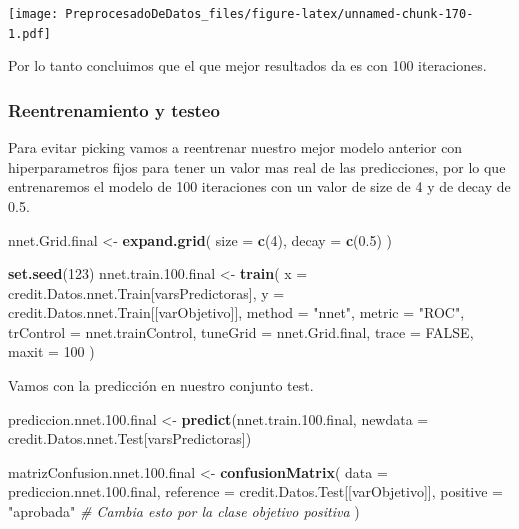 \documentclass[
]{article}
\newenvironment{Shaded}{\begin{snugshade}}{\end{snugshade}}
\newcommand{\AttributeTok}[1]{\textcolor[rgb]{0.13,0.29,0.53}{#1}}
\newcommand{\CommentTok}[1]{\textcolor[rgb]{0.56,0.35,0.01}{\textit{#1}}}
\newcommand{\ConstantTok}[1]{\textcolor[rgb]{0.56,0.35,0.01}{#1}}
\newcommand{\DecValTok}[1]{\textcolor[rgb]{0.00,0.00,0.81}{#1}}
\newcommand{\FloatTok}[1]{\textcolor[rgb]{0.00,0.00,0.81}{#1}}
\newcommand{\FunctionTok}[1]{\textcolor[rgb]{0.13,0.29,0.53}{\textbf{#1}}}
\newcommand{\NormalTok}[1]{#1}
\newcommand{\OtherTok}[1]{\textcolor[rgb]{0.56,0.35,0.01}{#1}}
\newcommand{\StringTok}[1]{\textcolor[rgb]{0.31,0.60,0.02}{#1}}
\begin{document}
\texttt{[image: PreprocesadoDeDatos\_files/figure-latex/unnamed-chunk-170-1.pdf]}

Por lo tanto concluimos que el que mejor resultados da es con 100
iteraciones.

\hypertarget{reentrenamiento-y-testeo-1}{%
\subsubsection{Reentrenamiento y
testeo}\label{reentrenamiento-y-testeo-1}}

Para evitar picking vamos a reentrenar nuestro mejor modelo anterior con
hiperparametros fijos para tener un valor mas real de las predicciones,
por lo que entrenaremos el modelo de 100 iteraciones con un valor de
size de 4 y de decay de 0.5.

\begin{Shaded}
\begin{Highlighting}[]
\NormalTok{nnet.Grid.final }\OtherTok{\textless{}{-}} \FunctionTok{expand.grid}\NormalTok{(}
  \AttributeTok{size =} \FunctionTok{c}\NormalTok{(}\DecValTok{4}\NormalTok{),}
  \AttributeTok{decay =} \FunctionTok{c}\NormalTok{(}\FloatTok{0.5}\NormalTok{)}
\NormalTok{)}

\FunctionTok{set.seed}\NormalTok{(}\DecValTok{123}\NormalTok{)}
\NormalTok{nnet.train.}\FloatTok{100.}\NormalTok{final }\OtherTok{\textless{}{-}} \FunctionTok{train}\NormalTok{(}
  \AttributeTok{x =}\NormalTok{ credit.Datos.nnet.Train[varsPredictoras],}
  \AttributeTok{y =}\NormalTok{ credit.Datos.nnet.Train[[varObjetivo]],}
  \AttributeTok{method =} \StringTok{"nnet"}\NormalTok{,}
  \AttributeTok{metric =} \StringTok{"ROC"}\NormalTok{,}
  \AttributeTok{trControl =}\NormalTok{ nnet.trainControl,}
  \AttributeTok{tuneGrid =}\NormalTok{ nnet.Grid.final,}
  \AttributeTok{trace =} \ConstantTok{FALSE}\NormalTok{,}
  \AttributeTok{maxit =} \DecValTok{100}
\NormalTok{)}
\end{Highlighting}
\end{Shaded}

Vamos con la predicción en nuestro conjunto test.

\begin{Shaded}
\begin{Highlighting}[]
\NormalTok{prediccion.nnet.}\FloatTok{100.}\NormalTok{final }\OtherTok{\textless{}{-}} \FunctionTok{predict}\NormalTok{(nnet.train.}\FloatTok{100.}\NormalTok{final, }\AttributeTok{newdata =}\NormalTok{ credit.Datos.nnet.Test[varsPredictoras])}

\NormalTok{matrizConfusion.nnet.}\FloatTok{100.}\NormalTok{final }\OtherTok{\textless{}{-}} \FunctionTok{confusionMatrix}\NormalTok{(}
  \AttributeTok{data =}\NormalTok{ prediccion.nnet.}\FloatTok{100.}\NormalTok{final,}
  \AttributeTok{reference =}\NormalTok{ credit.Datos.Test[[varObjetivo]],}
  \AttributeTok{positive =} \StringTok{"aprobada"} \CommentTok{\# Cambia esto por la clase objetivo positiva}
\NormalTok{)}
\end{Highlighting}
\end{Shaded}
\end{document}
